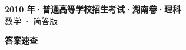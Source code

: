\documentclass[zihao=-4, a4paper]{ctexart}
\begin{document}
\begin{center}
  {\Large\bfseries 2010 年·普通高等学校招生考试·湖南卷·理科}\\[4pt]
  {\large 数学 · 简答版}
\end{center}
\medskip
{}

\clearpage
{}
\begin{center}{\Large\bfseries 答案速查}\end{center}
\medskip

\end{document}
